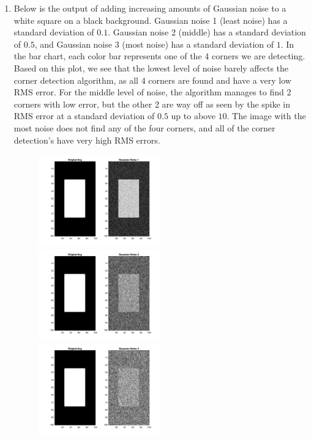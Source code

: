 \documentclass[12pt]{article}
\begin{document}
\begin{enumerate}
\begin{enumerate}
		
		\item Below is the output of adding increasing amounts of Gaussian noise to a white square on a black background. Gaussian noise 1 (least noise) has a standard deviation of $0.1$. Gaussian noise 2 (middle) has a standard deviation of $0.5$, and Gaussian noise 3 (most noise) has a standard deviation of $1$. In the bar chart, each color bar represents one of the 4 corners we are detecting. Based on this plot, we see that the lowest level of noise barely affects the corner detection algorithm, as all 4 corners are found and have a very low RMS error. For the middle level of noise, the algorithm manages to find 2 corners with low error, but the other 2 are way off as seen by the spike in RMS error at a standard deviation of $0.5$ up to above $10$. The image with the most noise does not find any of the four corners, and all of the corner detection's have very high RMS errors.
		\begin{figure}[H]
			\includegraphics[width=0.5\textwidth]{Q6C_gaussian1_results.jpg}
			\includegraphics[width=0.5\textwidth]{Q6C_gaussian2_results.jpg}
			\includegraphics[width=0.5\textwidth]{Q6C_gaussian3_results.jpg}

\end{figure}
\end{enumerate}
\end{enumerate}
\end{document}
